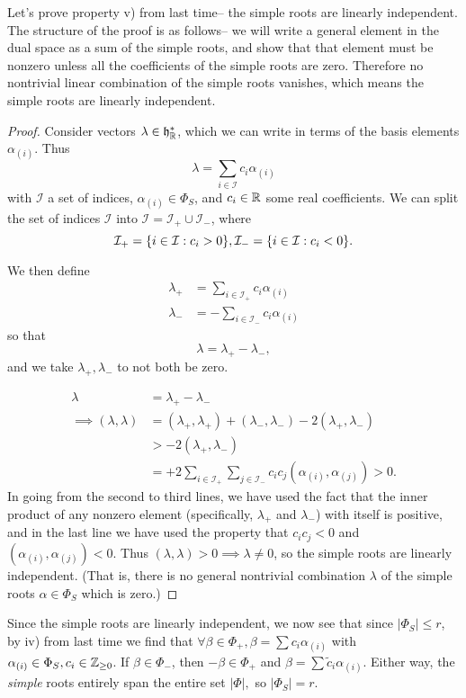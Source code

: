 Let's prove property v) from last time-- the simple roots are linearly independent. The structure of the proof is as follows-- we will write a general element in the dual space as a sum of the simple roots, and show that that element must be nonzero unless all the coefficients of the simple roots are zero. Therefore no nontrivial linear combination of the simple roots vanishes, which means the simple roots are linearly independent.
\begin{proof}
Consider vectors $\lambda\in \mathfrak{h}^*_{\mathbb{R}}$, which we can write in terms of the basis elements $\alpha_{(i)}$. Thus
$$\lambda=\sum_{i\in \mathcal{I}} c_i \alpha_{(i)}$$
with $\mathcal{I}$ a set of indices, $\alpha_{(i)}\in \Phi_S$, and $c_i\in \mathbb{R}$ some real coefficients. We can split the set of indices $\mathcal{I}$ into $\mathcal{I}=\mathcal{I}_+ \cup \mathcal{I}_-$, where
$$\mathcal{I}_+=\{i\in \mathcal{I}: c_i >0\},\mathcal{I}_-=\{i\in \mathcal{I}: c_i <0\}.$$

We then define
\begin{align*}
    \lambda_+ &= \sum_{i\in \mathcal{I}_+} c_i \alpha_{(i)}\\
    \lambda_- &= -\sum_{i\in \mathcal{I}_-} c_i \alpha_{(i)}
\end{align*}
so that
$$\lambda=\lambda_+-\lambda_-,$$
and we take $\lambda_+,\lambda_-$ to not both be zero.

\begin{align*}
    \lambda&=\lambda_+-\lambda_-\\
    \implies (\lambda,\lambda)&=(\lambda_+,\lambda_+)+(\lambda_-,\lambda_-)-2(\lambda_+,\lambda_-)\\
    &> -2(\lambda_+,\lambda_-)\\
    &=+2 \sum_{i\in \mathcal{I}_+} \sum_{j\in \mathcal{I}_-} c_i c_j (\alpha_{(i)},\alpha_{(j)}) >0.
\end{align*}
In going from the second to third lines, we have used the fact that the inner product of any nonzero element (specifically, $\lambda_+$ and $\lambda_-$) with itself is positive, and in the last line we have used the property that $c_ic_j <0$ and $(\alpha_{(i)},\alpha_{(j)})<0$. Thus $(\lambda,\lambda)>0 \implies \lambda\neq 0$, so the simple roots are linearly independent. (That is, there is no general nontrivial combination $\lambda$ of the simple roots $\alpha\in \Phi_S$ which is zero.)
\end{proof}

Since the simple roots are linearly independent, we now see that since $|\Phi_S|\leq r$, by iv) from last time we find that $\forall \beta \in \Phi_+,\beta=\sum c_i \alpha_{(i)}$ with $\alpha_{(i)} \in \Phi_S, c_i \in \mathbb{Z}_{\geq 0}$. If $\beta \in \Phi_-$, then $-\beta \in \Phi_+$ and $\beta=\sum \tilde c_i \alpha_{(i)}.$ Either way, the \emph{simple} roots entirely span the entire set $|\Phi|,$ so $|\Phi_S|=r$.

